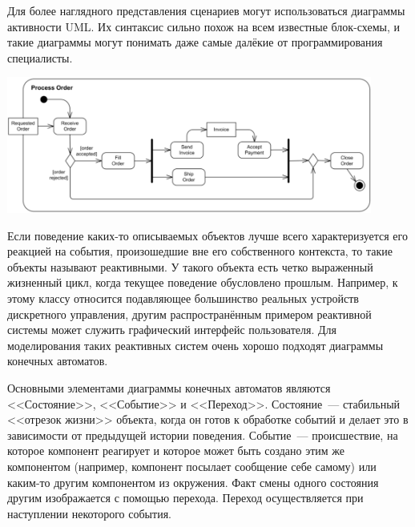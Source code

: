 \documentclass{../../text-style}
\begin{document}
Для более наглядного представления сценариев могут использоваться диаграммы активности UML. Их синтаксис сильно похож на всем известные блок-схемы, и такие диаграммы могут понимать даже самые далёкие от программирования специалисты.

\begin{center}
    \includegraphics[width=0.9\textwidth]{activity.png}
\end{center}

Если поведение каких-то описываемых объектов лучше всего характеризуется его реакцией на события, произошедшие вне его собственного контекста, то такие объекты называют реактивными. У такого объекта есть четко выраженный жизненный цикл, когда текущее поведение обусловлено прошлым. Например, к этому классу относится подавляющее большинство реальных устройств дискретного управления, другим распространённым примером реактивной системы может служить графический интерфейс пользователя. Для моделирования таких реактивных систем очень хорошо подходят диаграммы конечных автоматов.

Основными элементами диаграммы конечных автоматов являются <<Состояние>>, <<Событие>> и <<Переход>>. Состояние~--- стабильный <<отрезок жизни>> объекта, когда он готов к обработке событий и делает это в зависимости от предыдущей истории поведения. Событие~--- происшествие, на которое компонент реагирует и которое может быть создано этим же компонентом (например, компонент посылает сообщение себе самому) или каким-то другим компонентом из окружения. Факт смены одного состояния другим изображается с помощью перехода. Переход осуществляется при наступлении некоторого события.
\end{document}
